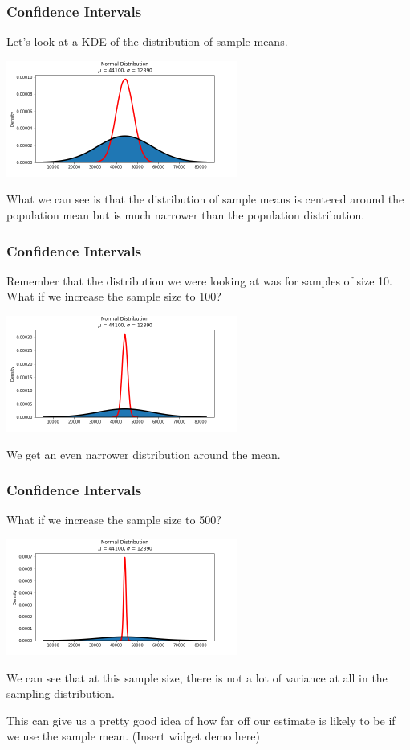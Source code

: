 \documentclass[11pt, table]{beamer}
\begin{document}
\begin{frame}
\frametitle{Confidence Intervals}
Let's look at a KDE of the distribution of sample means.

\begin{center}
\includegraphics[width = 3in]{images/sd_kde.png}
\end{center}

What we can see is that the distribution of sample means is centered around the population mean but is much narrower than the population distribution.
\end{frame}

\begin{frame}
\frametitle{Confidence Intervals}
Remember that the distribution we were looking at was for samples of size 10. What if we increase the sample size to 100?

\begin{center}
\includegraphics[width = 3in]{images/sd_kde_larger.png}
\end{center}

We get an even narrower distribution around the mean.
\end{frame}

\begin{frame}
\frametitle{Confidence Intervals}
What if we increase the sample size to 500?

\begin{center}
\includegraphics[width = 3in]{images/sd_kde_even_larger.png}
\end{center}

We can see that at this sample size, there is not a lot of variance at all in the sampling distribution. 
\vspace{0.1in}

This can give us a pretty good idea of how far off our estimate is likely to be if we use the sample mean. (Insert widget demo here)
\end{frame}
\end{document}

